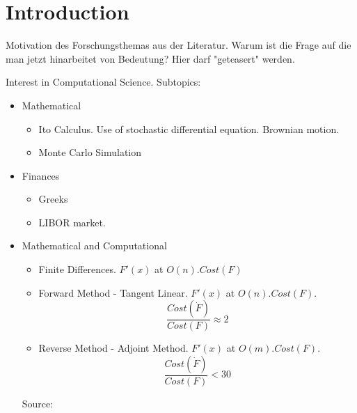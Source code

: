 
\section{Introduction}
Motivation des Forschungsthemas aus der Literatur. Warum ist die Frage auf die man jetzt hinarbeitet von Bedeutung? Hier darf "geteasert" werden.


Interest in Computational Science. Subtopics:

\begin{itemize}
\item Mathematical
	\begin{itemize}
		\item Ito Calculus. Use of stochastic differential equation. Brownian motion.
		\item Monte Carlo Simulation
	\end{itemize}
	\item Finances
	\begin{itemize}
		\item Greeks
		\item LIBOR market.
	\end{itemize}
	\item Mathematical and Computational
	\begin{itemize}
		\item Finite Differences. $F'(x)$ at $O(n).Cost(F)$
	    \item Forward Method - Tangent Linear. $F'(x)$ at $O(n).Cost(F)$. 
	    \begin{equation}
	    	\frac{Cost(\dot{F})}{Cost(F)} \approx 2
	    \end{equation}
    	\item Reverse Method - Adjoint Method. $F'(x)$ at $O(m).Cost(F)$.
    	 \begin{equation}
	    	\frac{Cost(\dot{F})}{Cost(F)} < 30
	    \end{equation}
	\end{itemize}
	Source: %
    


    

\end{itemize}





